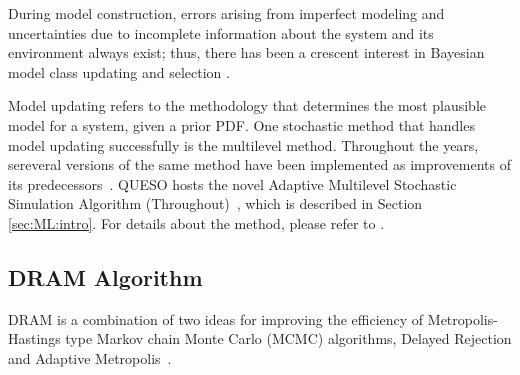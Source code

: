 During model construction, errors arising from imperfect modeling and
uncertainties due to incomplete information about the system and its
environment always exist; thus, there has been a crescent interest in Bayesian
model class updating  and selection
\cite{ChingChen2007,ChOlPr10,CheungPrudencio2012}. 

Model updating refers to the methodology that determines the most plausible
model for a system, given a prior PDF. One stochastic method that handles model
updating successfully is the multilevel method. Throughout the years, sereveral
versions of the same method have been implemented as improvements of its
predecessors~\cite{BeckAu2002,ChingChen2007,CheungPrudencio2012}. QUESO hosts
the novel Adaptive Multilevel Stochastic Simulation Algorithm
(Throughout)~\cite{CheungPrudencio2012}, which is described in Section
\ref{sec:ML:intro}. For details about the method, please refer to
\cite{CheungPrudencio2012}.



\subsection{DRAM Algorithm}\label{sec:DRAM}

DRAM is a combination of two ideas for improving the efficiency of
Metropolis-Hastings type Markov chain Monte Carlo (MCMC) algorithms, Delayed
Rejection and Adaptive Metropolis~\cite{DRAMtool}. 

